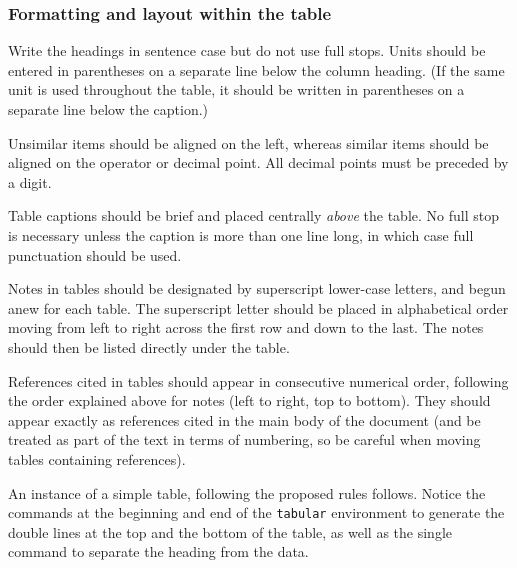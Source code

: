 \documentclass{cernrep}
\begin{document}
\subsubsection{Formatting and layout within the table}

Write the headings in sentence case but do not use full stops. Units
should be entered in parentheses on a separate line below the column
heading. (If the same unit is used throughout the table, it should be
written in parentheses on a separate line below the caption.)

Unsimilar items should be aligned on the left, whereas similar items
should be aligned on the operator or decimal point. All decimal points
must be preceded by a digit.


Table captions should be brief and placed centrally \emph{above} the
table. No full stop is necessary unless the caption is more than one
line long, in which case full punctuation should be used. 


Notes in tables should be designated by superscript lower-case
letters, and begun anew for each table. The superscript letter should
be placed in alphabetical order moving from left to right across the
first row and down to the last. The notes should then be listed
directly under the table.

References cited in tables should appear in consecutive numerical
order, following the order explained above for notes (left to right,
top to bottom).  They should appear exactly as references cited in the
main body of the document (and be treated as part of the text in terms
of numbering, so be careful when moving tables containing references).


An instance of a simple table, following the proposed rules follows.
Notice the  commands at the beginning and end of the
\texttt{tabular} environment to generate the double lines at the top
and the bottom of the table, as well as the single  command
to separate the heading from the data.
\end{document}
